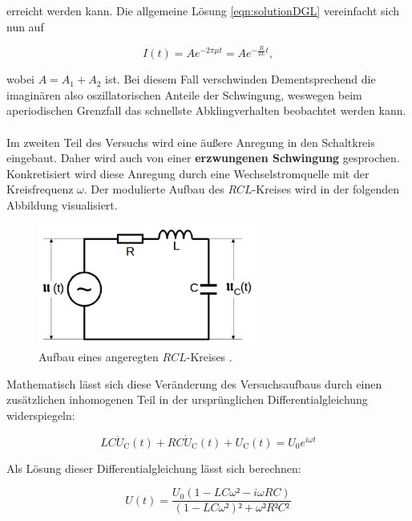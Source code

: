 \noindent erreicht werden kann. Die allgemeine Lösung \eqref{eqn:solutionDGL} vereinfacht sich nun auf 

\begin{equation*}
    I(t) = Ae^{-2\pi\mu{}t} = Ae^{-\frac{R}{2L}t},
\end{equation*}

\noindent wobei $A = A_1 + A_2$ ist. Bei diesem Fall verschwinden Dementsprechend die imaginären also oszillatorischen Anteile 
der Schwingung, weswegen beim aperiodischen Grenzfall das schnellste Abklingverhalten beobachtet werden kann.\\\\

\noindent Im zweiten Teil des Versuchs wird eine äußere Anregung in den Schaltkreis eingebaut. Daher wird auch von 
einer \textbf{erzwungenen Schwingung} gesprochen. Konkretisiert wird diese Anregung durch eine Wechselstromquelle mit 
der Kreisfrequenz $\omega$. Der modulierte Aufbau des $RCL$-Kreises wird in der folgenden Abbildung visualisiert.

\begin{figure}[H]
    \centering
    \includegraphics[height=4cm]{./content/AnregungRCL.png}
    \caption{Aufbau eines angeregten $RCL$-Kreises \cite{Versuchsanleitung_v354}.}
    \label{fig:AnregungRCL}
\end{figure}

\noindent Mathematisch lässt sich diese Veränderung des Versuchsaufbaus durch einen zusätzlichen inhomogenen Teil in der 
ursprünglichen Differentialgleichung widerspiegeln:

\begin{equation*}
    LC\ddot{U}_\text{C}(t) + RC\dot{U}_\text{C}(t) + U_\text{C}(t) = U_0e^{i\omega{}t}
\end{equation*}

\noindent Als Lösung dieser Differentialgleichung lässt sich berechnen:

\begin{equation*}
    U(t) = \frac{U_0\left(1 - LC\omega² - i\omega RC\right)}{\left(1 - LC\omega²\right)² + \omega²R²C²}
\end{equation*}

